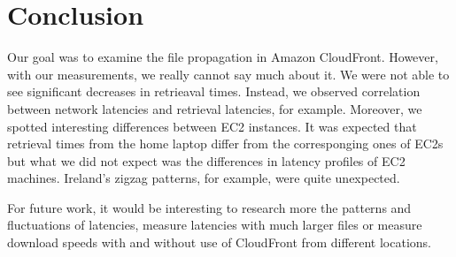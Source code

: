 \documentclass[conference]{IEEEtran}
\begin{document}
\section{Conclusion}
Our goal was to examine the file propagation in Amazon CloudFront. However, with our measurements, we really cannot say much about it. We were not able to see significant decreases in retrieaval times. Instead, we observed correlation between network latencies and retrieval latencies, for example. Moreover, we spotted interesting differences between EC2 instances. It was expected that retrieval times from the home laptop differ from the corresponging ones of EC2s but what we did not expect was the differences in latency profiles of EC2 machines. Ireland's zigzag patterns, for example, were quite unexpected. 

For future work, it would be interesting to research more the patterns and fluctuations of latencies, measure latencies with much larger files or measure download speeds with and without use of CloudFront from different locations.





%
%
%







\end{document}
